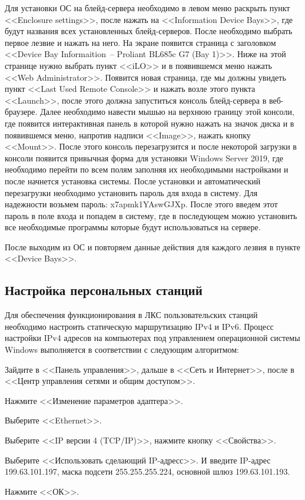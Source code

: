 Для установки ОС на блейд-сервера необходимо в левом меню раскрыть пункт <<Enclosure settings>>, после нажать на <<Information Device Bays>>, где будут названия всех установленных блейд-серверов. После необходимо выбрать первое лезвие и нажать на него. На экране появится страница с заголовком <<Device Bay Informaition~-- Proliant BL685c G7 (Bay 1)>>. Ниже на этой странице нужно выбрать пункт <<iLO>> и в появившемся меню нажать <<Web Administrator>>. Появится новая страница, где мы должны увидеть пункт <<Last Used Remote Console>> и нажать возле этого пункта <<Launch>>, после этого должна запуститься консоль блейд-сервера в веб-браузере. Далее необходимо навести мышью на верхнюю границу этой консоли, где появится интерактивная панель в которой нужно нажать на значок диска и в появившемся меню, напротив надписи <<Image>>, нажать кнопку <<Mount>>. После этого консоль перезагрузится и после некоторой загрузки в консоли появится привычная форма для установки Windows Server 2019, где необходимо перейти по всем полям заполняя их необходимыми настройками и после начнется установка системы. После установки и автоматический перезагрузки необходимо установить пароль для входа в систему. Для надежности возьмем пароль: x7apmk1YAswGJXp. После этого введем этот пароль в поле входа и попадем в систему, где в последующем можно установить все необходимые программы которые будут использоваться на сервере.

После выходим из ОС и повторяем данные действия для каждого лезвия в пункте <<Device Bays>>.

\subsection{Настройка персональных станций}

Для обеспечения функционирования в ЛКС пользовательских станций необходимо настроить статическую маршрутизацию IPv4 и IPv6. Процесс настройки IPv4 адресов на компьютерах под управлением операционной системы Windows выполняется в соответствии с следующим алгоритмом:
\begin{enumerate_num}
    \item Зайдите в <<Панель управления>>, дальше в <<Сеть и Интернет>>, после в <<Центр управления сетями и общим доступом>>.
    \item Нажмите <<Изменение параметров адаптера>>.
    \item Выберите <<Ethernet>>.
    \item Выберите <<IP версии 4 (TCP/IP)>>, нажмите кнопку <<Свойства>>. 
    \item Выберите <<Использовать сделающий IP-адресс>>. И введите IP-адрес 199.63.101.197, маска подсети 255.255.255.224, основной шлюз 199.63.101.193.
    \item Нажмите <<ОК>>.
\end{enumerate_num}

